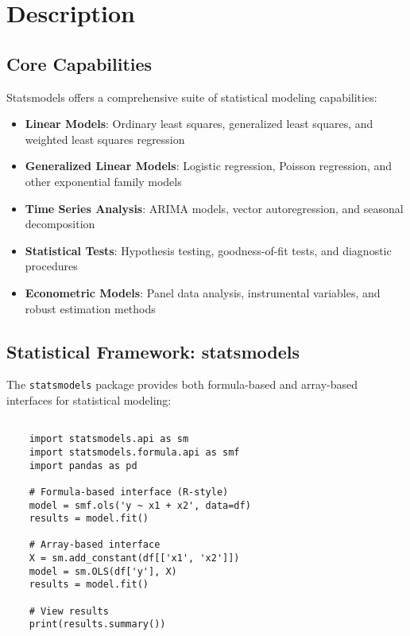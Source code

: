 \section{Description}
\label{sec:description}

\subsection{Core Capabilities}
\label{subsec:capabilities}

Statsmodels offers a comprehensive suite of statistical modeling capabilities:

\begin{itemize}
	\item \textbf{Linear Models}: Ordinary least squares, generalized least squares, and weighted least squares regression
	\item \textbf{Generalized Linear Models}: Logistic regression, Poisson regression, and other exponential family models
	\item \textbf{Time Series Analysis}: ARIMA models, vector autoregression, and seasonal decomposition
	\item \textbf{Statistical Tests}: Hypothesis testing, goodness-of-fit tests, and diagnostic procedures
	\item \textbf{Econometric Models}: Panel data analysis, instrumental variables, and robust estimation methods
\end{itemize}

\clearpage

\subsection{Statistical Framework: statsmodels}
\label{subsec:statsmodels}

The \texttt{statsmodels} package provides both formula-based and array-based interfaces for statistical modeling:

\begin{lstlisting}[language=MyPython, caption={Statsmodels Core Functions}, label={lst:statsmodels_core}]
	
	import statsmodels.api as sm
	import statsmodels.formula.api as smf
	import pandas as pd
	
	# Formula-based interface (R-style)
	model = smf.ols('y ~ x1 + x2', data=df)
	results = model.fit()
	
	# Array-based interface
	X = sm.add_constant(df[['x1', 'x2']])
	model = sm.OLS(df['y'], X)
	results = model.fit()
	
	# View results
	print(results.summary())
	
\end{lstlisting}

